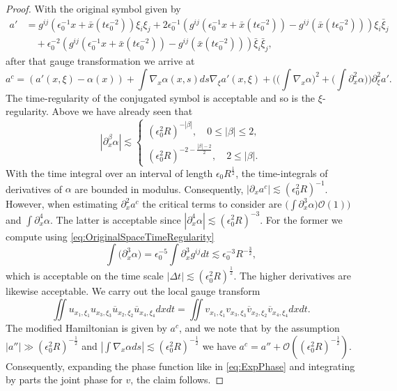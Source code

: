 \documentclass{amsart}
\theoremstyle{definition}
\begin{document}
\begin{proof}
With the original symbol given by
\begin{equation*}
\begin{split}
a' &= g^{ij}(\epsilon_0^{-1} x + \bar{x}(t \epsilon_0^{-2})) \xi_i \xi_j + 2 \epsilon_0^{-1} (g^{ij}(\epsilon_0^{-1} x + \bar{x}(t \epsilon_0^{-2})) - g^{ij}(\bar{x}(t\epsilon_0^{-2}))) \xi_i \bar{\xi}_j \\
&\quad + \epsilon_0^{-2} (g^{ij}(\epsilon_0^{-1} x + \bar{x}(t \epsilon_0^{-2})) - g^{ij}(\bar{x}(t\epsilon_0^{-2}))) \bar{\xi}_i \bar{\xi}_j,
\end{split}
\end{equation*}
after that gauge transformation we arrive at
\begin{equation*}
a^c = (a'(x,\xi) - \alpha(x)) + \int \nabla_x \alpha(x,s) ds \nabla_{\xi} a'(x,\xi) + \big( \big( \int \nabla_x \alpha \big)^2 + \big( \int \partial_x^2 \alpha \big) \big) \partial^2_{\xi} a'.
\end{equation*} 
The time-regularity of the conjugated symbol is acceptable and so is the $\xi$-regularity. Above we have already seen that
\begin{equation*}
|\partial_x^{\beta} \alpha| \lesssim 
\begin{cases}
(\epsilon_0^2 R)^{-|\beta|}, \quad 0 \leq |\beta| \leq 2, \\
(\epsilon_0^2 R)^{-2 - \frac{|\beta|-2}{2}}, \quad 2 \leq |\beta|.
\end{cases}
\end{equation*}
With the time integral over an interval of length $\epsilon_0 R^{\frac{1}{2}}$, the time-integrals of derivatives of $\alpha$ are bounded in modulus.
Consequently, $|\partial_x a^c| \lesssim (\epsilon_0^2 R)^{-1}$. However, when estimating $\partial_x^2 a^c$ the critical terms to consider are $ \big( \int \partial_x^3 \alpha \big) \mathcal{O}(1))$ and $\int \partial_x^4 \alpha$. The latter is acceptable since $|\partial_x^4 \alpha| \lesssim (\epsilon_0^2 R)^{-3}$. For the former we compute using \eqref{eq:OriginalSpaceTimeRegularity} 
\begin{equation*}
\int \big( \partial_x^3 \alpha \big) = \epsilon_0^{-5} \int \partial_x^3 g^{ij} dt \lesssim \epsilon_0^{-3} R^{- \frac{3}{2}},
\end{equation*}
which is acceptable on the time scale $|\Delta t| \lesssim (\epsilon_0^2 R)^{\frac{1}{2}}$. The higher derivatives are likewise acceptable. We carry out the local gauge transform
\begin{equation*}
\iint u_{x_1,\xi_1} u_{x_3,\xi_3} \overline{u}_{x_2,\xi_2} \overline{u}_{x_4,\xi_4} dx dt = \iint v_{x_1,\xi_1} v_{x_3,\xi_3} \overline{v}_{x_2,\xi_2} \overline{v}_{x_4,\xi_4} dx dt.
\end{equation*}
The modified Hamiltonian is given by $a^c$, and we note that by the assumption
$|a''| \gg (\epsilon_0^2 R)^{-\frac{1}{2}}$ and $|\int \nabla_x \alpha ds| \lesssim (\epsilon_0^2 R)^{-\frac{1}{2}}$ we have $a^c = a'' + \mathcal{O}((\epsilon_0^2 R)^{-\frac{1}{2}})$.
Consequently, expanding the phase function like in \eqref{eq:ExpPhase} and integrating by parts the joint phase for $v$, the claim follows.
\end{proof}
\end{document}
